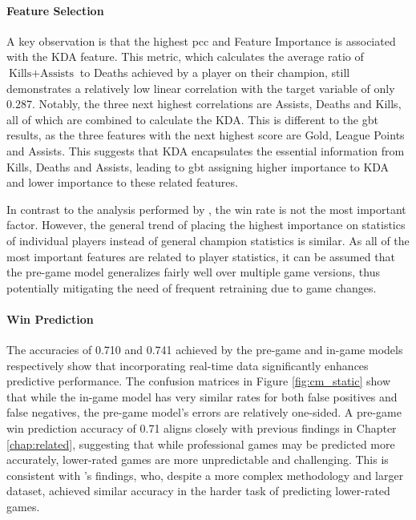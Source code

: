 \documentclass[12pt, a4paper, headinclude, twoside, plainheadsepline, open=right, numbers=noenddot, hidelinks, toc=listof, toc=bibliography]{scrreprt}
\begin{document}
\paragraph{Feature Selection}
A key observation is that the highest \ac{pcc} and Feature Importance is associated with the KDA feature. 
This metric, which calculates the average ratio of $\text{Kills} + \text{Assists}$ to Deaths achieved by a player on their champion, still demonstrates a relatively low linear correlation with the target variable of only $0.287$.
Notably, the three next highest correlations are Assists, Deaths and Kills, all of which are combined to calculate the KDA.
This is different to the \ac{gbt} results, as the three features with the next highest score are Gold, League Points and Assists.
This suggests that KDA encapsulates the essential information from Kills, Deaths and Assists, leading to \ac{gbt} assigning higher importance to KDA and lower importance to these related features.

In contrast to the analysis performed by \citeauthor{costaFeatureAnalysisLeague2021} \cite{costaFeatureAnalysisLeague2021}, the win rate is not the most important factor.
However, the general trend of placing the highest importance on statistics of individual players instead of general champion statistics is similar.
As all of the most important features are related to player statistics, it can be assumed that the pre-game model generalizes fairly well over multiple game versions, thus potentially mitigating the need of frequent retraining due to game changes.

\paragraph{Win Prediction}
The accuracies of 0.710 and 0.741 achieved by the pre-game and in-game models respectively show that incorporating real-time data significantly enhances predictive performance. 
The confusion matrices in Figure \ref{fig:cm_static} show that while the in-game model has very similar rates for both false positives and false negatives, the pre-game model's errors are relatively one-sided.
A pre-game win prediction accuracy of 0.71 aligns closely with previous findings in Chapter \ref{chap:related}, suggesting that while professional games may be predicted more accurately, lower-rated games are more unpredictable and challenging.
This is consistent with 's  \cite{whiteScalablePsychologicalMomentum2020} findings, who, despite a more complex methodology and larger dataset, achieved similar accuracy in the harder task of predicting lower-rated games.
\end{document}
